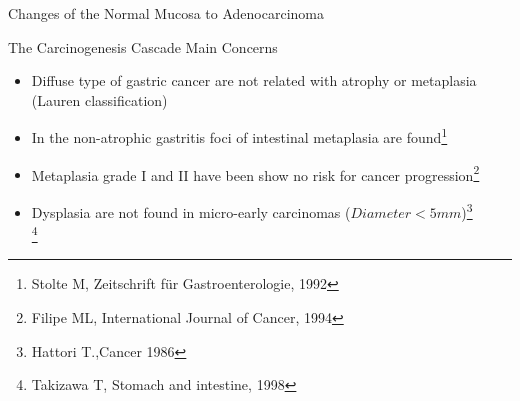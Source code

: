 \documentclass[usenames,dvipsnames]{beamer}
\let\oldfootnote\footnote
\renewcommand\footnote[1][]{\footnotesize\oldfootnote[frame,#1]}
\renewcommand{\footnotesize}{\tiny}
\begin{document}
\begin{frame}{Changes of the Normal Mucosa to Adenocarcinoma}
\end{frame}
%  

\begin{frame}{The Carcinogenesis Cascade Main Concerns}

\begin{itemize}
 \item Diffuse type of gastric cancer are not related with atrophy or metaplasia (Lauren classification)\\
 \pause
 \item In the non-atrophic gastritis foci of intestinal metaplasia are found\footnote[1]{Stolte M, Zeitschrift f\"ur Gastroenterologie, 1992}\\

 \pause
  \item \normalsize Metaplasia grade I and II have been show no risk for cancer progression\footnote[2]{Filipe ML, International Journal of Cancer, 1994}\footnotemark[1]\\
  \pause
  \item \normalsize Dysplasia are not found in micro-early carcinomas ($Diameter < 5mm$)\footnote[3]{Hattori T.,Cancer 1986}\\
  \footnote[4]{Takizawa T, Stomach and intestine, 1998 }

  
\end{itemize}

\end{frame}
		
\end{document}
